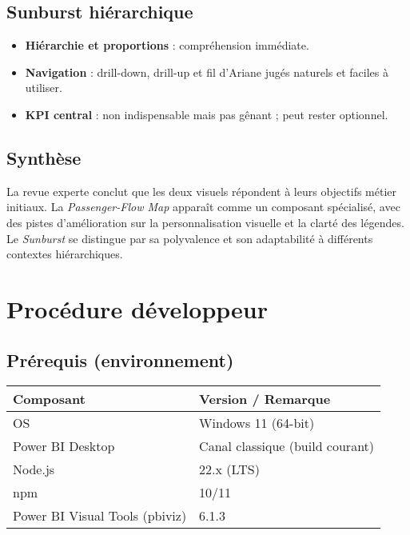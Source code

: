 \subsection{Sunburst hiérarchique}
\begin{itemize}[nosep]
  \item \textbf{Hiérarchie et proportions} : compréhension immédiate.
  \item \textbf{Navigation} : drill-down, drill-up et fil d’Ariane jugés naturels et faciles à utiliser.
  \item \textbf{KPI central} : non indispensable mais pas gênant ; peut rester optionnel.
\end{itemize}

\subsection{Synthèse}
La revue experte conclut que les deux visuels répondent à leurs objectifs métier initiaux.  
La \textit{Passenger-Flow Map} apparaît comme un composant spécialisé, 
avec des pistes d’amélioration sur la personnalisation visuelle et la clarté des légendes.  
Le \textit{Sunburst} se distingue par sa polyvalence et son adaptabilité à différents contextes hiérarchiques.



\section{Procédure développeur}
\label{ann:a5-dev}

\subsection{Prérequis (environnement)}
\begin{tabularx}{\linewidth}{l X}
\toprule
\textbf{Composant} & \textbf{Version / Remarque} \\
\midrule
OS & Windows 11 (64-bit) \\
Power BI Desktop & Canal classique (build courant) \\
Node.js & 22.x (LTS) \\
npm & 10/11 \\
Power BI Visual Tools (pbiviz) & 6.1.3 \\
\bottomrule
\end{tabularx}

